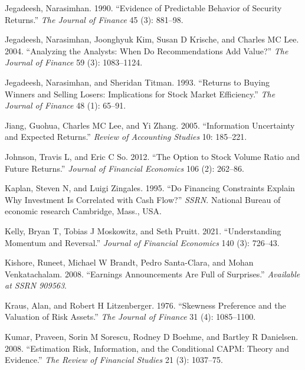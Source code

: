 \documentclass[
  letterpaper,
  DIV=11,
  numbers=noendperiod]{scrreprt}
\newlength{\cslhangindent}
\newlength{\cslentryspacingunit} %
\newenvironment{CSLReferences}[2] %
 {%
  \setlength{\parindent}{0pt}
  \ifodd #1
  \let\oldpar\par
  \def\par{\hangindent=\cslhangindent\oldpar}
  \fi
  \setlength{\parskip}{#2\cslentryspacingunit}
 }%
 {}
\begin{document}
\begin{CSLReferences}{1}{0}
\leavevmode{}%
Jegadeesh, Narasimhan. 1990. {``Evidence of Predictable Behavior of
Security Returns.''} \emph{The Journal of Finance} 45 (3): 881--98.

\leavevmode{}%
Jegadeesh, Narasimhan, Joonghyuk Kim, Susan D Krische, and Charles MC
Lee. 2004. {``Analyzing the Analysts: When Do Recommendations Add
Value?''} \emph{The Journal of Finance} 59 (3): 1083--1124.

\leavevmode{}%
Jegadeesh, Narasimhan, and Sheridan Titman. 1993. {``Returns to Buying
Winners and Selling Losers: Implications for Stock Market Efficiency.''}
\emph{The Journal of Finance} 48 (1): 65--91.

\leavevmode{}%
Jiang, Guohua, Charles MC Lee, and Yi Zhang. 2005. {``Information
Uncertainty and Expected Returns.''} \emph{Review of Accounting Studies}
10: 185--221.

\leavevmode{}%
Johnson, Travis L, and Eric C So. 2012. {``The Option to Stock Volume
Ratio and Future Returns.''} \emph{Journal of Financial Economics} 106
(2): 262--86.

\leavevmode{}%
Kaplan, Steven N, and Luigi Zingales. 1995. {``Do Financing Constraints
Explain Why Investment Is Correlated with Cash Flow?''} \emph{SSRN}.
National Bureau of economic research Cambridge, Mass., USA.

\leavevmode{}%
Kelly, Bryan T, Tobias J Moskowitz, and Seth Pruitt. 2021.
{``Understanding Momentum and Reversal.''} \emph{Journal of Financial
Economics} 140 (3): 726--43.

\leavevmode{}%
Kishore, Runeet, Michael W Brandt, Pedro Santa-Clara, and Mohan
Venkatachalam. 2008. {``Earnings Announcements Are Full of Surprises.''}
\emph{Available at SSRN 909563}.

\leavevmode{}%
Kraus, Alan, and Robert H Litzenberger. 1976. {``Skewness Preference and
the Valuation of Risk Assets.''} \emph{The Journal of Finance} 31 (4):
1085--1100.

\leavevmode{}%
Kumar, Praveen, Sorin M Sorescu, Rodney D Boehme, and Bartley R
Danielsen. 2008. {``Estimation Risk, Information, and the Conditional
CAPM: Theory and Evidence.''} \emph{The Review of Financial Studies} 21
(3): 1037--75.


\end{CSLReferences}
\end{document}
